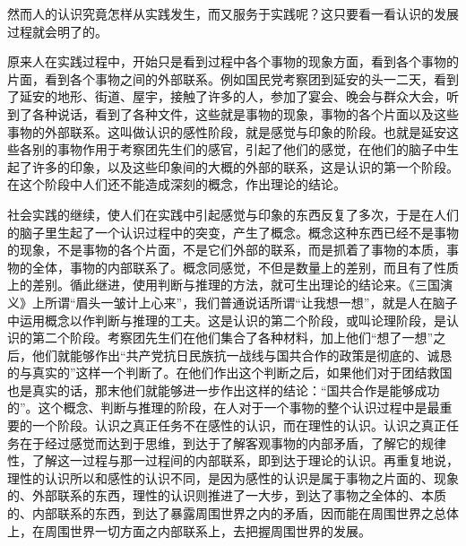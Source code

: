 \documentclass[UTF8, 12pt, a4paper]{ctexrep}
\begin{document}
然而人的认识究竟怎样从实践发生，而又服务于实践呢？这只要看一看认识的发展过程就会明了的。

原来人在实践过程中，开始只是看到过程中各个事物的现象方面，看到各个事物的片面，看到各个事物之间的外部联系。例如国民党考察团到延安的头一二天，看到了延安的地形、街道、屋宇，接触了许多的人，参加了宴会、晚会与群众大会，听到了各种说话，看到了各种文件，这些就是事物的现象，事物的各个片面以及这些事物的外部联系。这叫做认识的感性阶段，就是感觉与印象的阶段。也就是延安这些各别的事物作用于考察团先生们的感官，引起了他们的感觉，在他们的脑子中生起了许多的印象，以及这些印象间的大概的外部的联系，这是认识的第一个阶段。在这个阶段中人们还不能造成深刻的概念，作出理论的结论。

社会实践的继续，使人们在实践中引起感觉与印象的东西反复了多次，于是在人们的脑子里生起了一个认识过程中的突变，产生了概念。概念这种东西已经不是事物的现象，不是事物的各个片面，不是它们外部的联系，而是抓着了事物的本质，事物的全体，事物的内部联系了。概念同感觉，不但是数量上的差别，而且有了性质上的差别。循此继进，使用判断与推理的方法，就可生出理论的结论来。《三国演义》上所谓“眉头一皱计上心来”，我们普通说话所谓“让我想一想”，就是人在脑子中运用概念以作判断与推理的工夫。这是认识的第二个阶段，或叫论理阶段，是认识的第二个阶段。考察团先生们在他们集合了各种材料，加上他们“想了一想”之后，他们就能够作出“共产党抗日民族抗一战线与国共合作的政策是彻底的、诚恳的与真实的”这样一个判断了。在他们作出这个判断之后，如果他们对于团结救国也是真实的话，那末他们就能够进一步作出这样的结论：“国共合作是能够成功的”。这个概念、判断与推理的阶段，在人对于一个事物的整个认识过程中是最重要的一个阶段。认识之真正任务不在感性的认识，而在理性的认识。认识之真正任务在于经过感觉而达到于思维，到达于了解客观事物的内部矛盾，了解它的规律性，了解这一过程与那一过程间的内部联系，即到达于理论的认识。再重复地说，理性的认识所以和感性的认识不同，是因为感性的认识是属于事物之片面的、现象的、外部联系的东西，理性的认识则推进了一大步，到达了事物之全体的、本质的、内部联系的东西，到达了暴露周围世界之内的矛盾，因而能在周围世界之总体上，在周围世界一切方面之内部联系上，去把握周围世界的发展。
\end{document}

